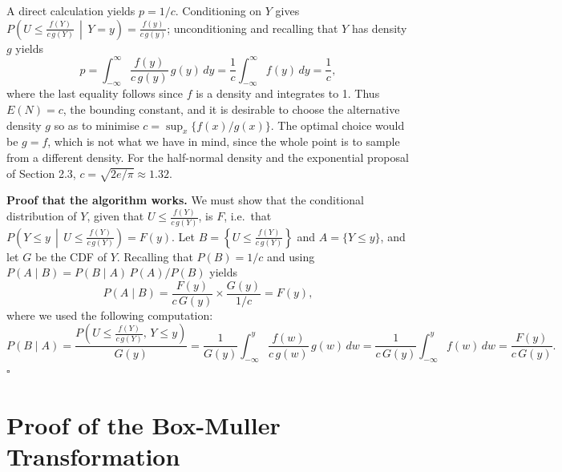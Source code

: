 \documentclass[12pt,a4paper]{article}
\begin{document}
{A direct calculation yields $p = 1/c$. Conditioning on $Y$ gives $P\left(U \le \frac{f(Y)}{c\,g(Y)} \,\middle|\, Y = y\right) = \frac{f(y)}{c\,g(y)}$; unconditioning and recalling that $Y$ has density $g$ yields
\[
p = \int_{-\infty}^{\infty} \frac{f(y)}{c\,g(y)}\, g(y)\,dy = \frac{1}{c}\int_{-\infty}^{\infty} f(y)\,dy = \frac{1}{c},
\]
where the last equality follows since $f$ is a density and integrates to 1. Thus $E(N) = c$, the bounding constant, and it is desirable to choose the alternative density $g$ so as to minimise $c = \sup_x \{f(x)/g(x)\}$. The optimal choice would be $g = f$, which is not what we have in mind, since the whole point is to sample from a different density. For the half-normal density and the exponential proposal of Section 2.3, $c = \sqrt{2e/\pi} \approx 1.32$.

\textbf{Proof that the algorithm works.} We must show that the conditional distribution of $Y$, given that $U \le \frac{f(Y)}{c\,g(Y)}$, is $F$, i.e.\ that $P\left(Y \le y \,\middle|\, U \le \frac{f(Y)}{c\,g(Y)}\right) = F(y)$. Let $B = \left\{U \le \frac{f(Y)}{c\,g(Y)}\right\}$ and $A = \{Y \le y\}$, and let $G$ be the CDF of $Y$. Recalling that $P(B) = 1/c$ and using $P(A \mid B) = P(B \mid A)\,P(A)/P(B)$ yields
\[
P(A \mid B) = \frac{F(y)}{c\,G(y)} \times \frac{G(y)}{1/c} = F(y),
\]
where we used the following computation:
\[
P(B \mid A) = \frac{P\left(U \le \frac{f(Y)}{c\,g(Y)},\, Y \le y\right)}{G(y)}
= \frac{1}{G(y)}\int_{-\infty}^{y} \frac{f(w)}{c\,g(w)}\, g(w)\,dw
= \frac{1}{c\,G(y)}\int_{-\infty}^{y} f(w)\,dw = \frac{F(y)}{c\,G(y)}.
\]
\hfill$\square$

\section{Proof of the Box-Muller Transformation}

}
\end{document}
